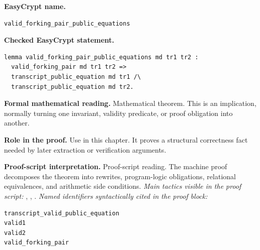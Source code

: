 \begin{formaltheorem}
\noindent\textbf{EasyCrypt name.}
\begin{lstlisting}[language=EasyCrypt,basicstyle=\ttfamily\scriptsize]
valid_forking_pair_public_equations
\end{lstlisting}
\noindent\textbf{Checked EasyCrypt statement.}
\begin{lstlisting}[language=EasyCrypt,basicstyle=\ttfamily\scriptsize]
lemma valid_forking_pair_public_equations md tr1 tr2 :
  valid_forking_pair md tr1 tr2 =>
  transcript_public_equation md tr1 /\
  transcript_public_equation md tr2.
\end{lstlisting}
\noindent\textbf{Formal mathematical reading.}
Mathematical theorem. This is an implication, normally turning one invariant, validity predicate, or proof obligation into another.

\noindent\textbf{Role in the proof.}
Use in this chapter. It proves a structural correctness fact needed by later extraction or verification arguments.

\noindent\textbf{Proof-script interpretation.}
Proof-script reading. The machine proof decomposes the theorem into rewrites, program-logic obligations, relational equivalences, and arithmetic side conditions.
\emph{Main tactics visible in the proof script:} \ec{rewrite}, \ec{split}, \ec{apply}.
\emph{Named identifiers syntactically cited in the proof block:}
\begin{lstlisting}[language=EasyCrypt,basicstyle=\ttfamily\scriptsize]
transcript_valid_public_equation
valid1
valid2
valid_forking_pair
\end{lstlisting}

\end{formaltheorem}

